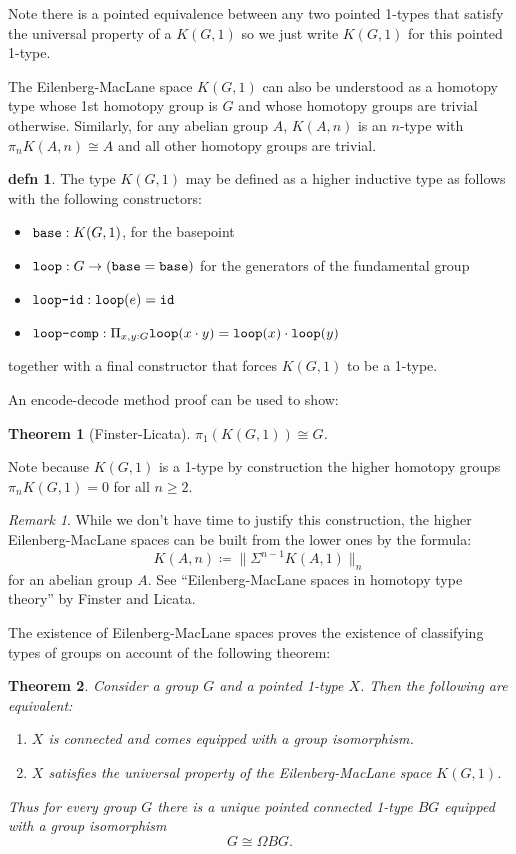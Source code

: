 \documentclass{amsart}
\theoremstyle{theorem}
\newtheorem*{thm}{Theorem}
\theoremstyle{definition}
\newtheorem*{defn}{defn}
\theoremstyle{remark}
\newtheorem*{rmk}{Remark}
\newcommand{\0}{\mathbbe{0}}
\newcommand{\1}{\mathbbe{1}}
\newcommand{\2}{\mathbbe{2}}
\newcommand{\3}{\mathbbe{3}}
\newcommand{\4}{\mathbbe{4}}
\newcommand{\term}[1]{{\textup{\texttt{#1}}}}
\newcommand{\id}{\term{id}}
\newcommand{\base}{\term{base}}
\newcommand{\lloop}{\term{loop}}
\begin{document}
Note there is a pointed equivalence between any two pointed 1-types that satisfy the universal property of a $K(G,1)$ so we just write $K(G,1)$ for this pointed 1-type.

The Eilenberg-MacLane space $K(G,1)$ can also be understood as a homotopy type whose 1st homotopy group is $G$ and whose homotopy groups are trivial otherwise. Similarly, for any abelian group $A$, $K(A,n)$ is an $n$-type with $\pi_nK(A,n) \cong A$ and all other homotopy groups are trivial.

\begin{defn} The type $K(G,1)$ may be defined as a higher inductive type as follows with the following constructors:
\begin{itemize}
\item $\base : K(G,1)$, for the basepoint
\item $\lloop : G \to (\base = \base)$ for the generators of the fundamental group
\item $\term{loop-id} : \lloop(e) = \id$
\item $\term{loop-comp} : \Pi_{x,y :G} \lloop (x \cdot y) =\lloop(x) \cdot \lloop(y)$
\end{itemize}
together with a final constructor that forces $K(G,1)$ to be a 1-type.
\end{defn}

An encode-decode method proof can be used to show:

\begin{thm}[Finster-Licata] $\pi_1(K(G,1)) \cong G$.
\end{thm}

Note because $K(G,1)$ is a 1-type by construction the higher homotopy groups $\pi_nK(G,1)=0$ for all $n \geq 2$.

\begin{rmk}
While we don't have time to justify this construction, the higher Eilenberg-MacLane spaces can be built from the lower ones by the formula:
\[ K(A,n) \coloneq \| \Sigma^{n-1}K(A,1)\|_n\]
for an abelian group $A$. See ``Eilenberg-MacLane spaces in homotopy type theory'' by Finster and Licata.
\end{rmk}

The existence of Eilenberg-MacLane spaces proves the existence of classifying types of groups on account of the following theorem: 

\begin{thm} Consider a group $G$ and a pointed 1-type $X$. Then the following are equivalent:
\begin{enumerate}
\item $X$ is connected and comes equipped with a group isomorphism.
\item $X$ satisfies the universal property of the Eilenberg-MacLane space $K(G,1)$.
\end{enumerate}
Thus for every group $G$ there is a unique pointed connected 1-type $BG$ equipped with a group isomorphism 
\[ G \cong \Omega BG.\]
\end{thm}
\end{document}
